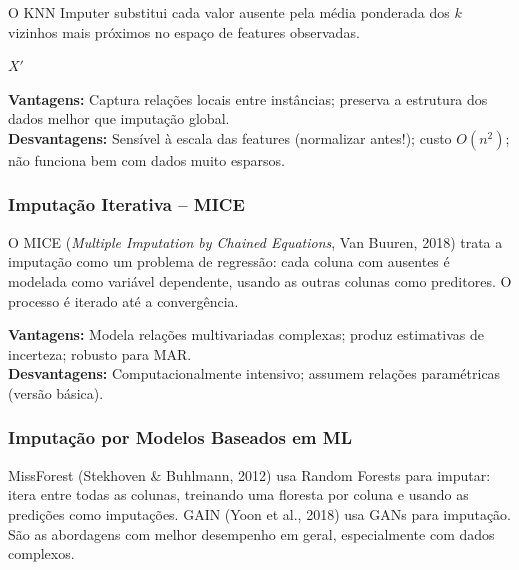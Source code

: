 \documentclass[12pt,a4paper]{article}
\begin{document}
O KNN Imputer substitui cada valor ausente pela média ponderada dos $k$ vizinhos mais próximos no espaço de features observadas.

\begin{algorithm}[H]
\caption{KNN Imputation}
\SetAlgoLined
{}
\Return $X'$\;
\end{algorithm}

\textbf{Vantagens:} Captura relações locais entre instâncias; preserva a estrutura dos dados melhor que imputação global.\\
\textbf{Desvantagens:} Sensível à escala das features (normalizar antes!); custo $O(n^2)$; não funciona bem com dados muito esparsos.

\subsubsection{Imputação Iterativa -- MICE}

O MICE (\textit{Multiple Imputation by Chained Equations}, Van Buuren, 2018) trata a imputação como um problema de regressão: cada coluna com ausentes é modelada como variável dependente, usando as outras colunas como preditores. O processo é iterado até a convergência.

\textbf{Vantagens:} Modela relações multivariadas complexas; produz estimativas de incerteza; robusto para MAR.\\
\textbf{Desvantagens:} Computacionalmente intensivo; assumem relações paramétricas (versão básica).

\subsubsection{Imputação por Modelos Baseados em ML}

MissForest (Stekhoven \& Buhlmann, 2012) usa Random Forests para imputar: itera entre todas as colunas, treinando uma floresta por coluna e usando as predições como imputações. GAIN (Yoon et al., 2018) usa GANs para imputação. São as abordagens com melhor desempenho em geral, especialmente com dados complexos.
\end{document}
